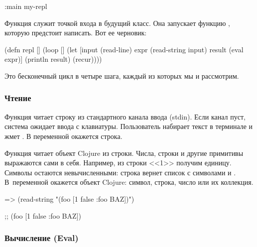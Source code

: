 \begin{english}
  \begin{clojure}
:main my-repl
  \end{clojure}
\end{english}

Функция  служит точкой входа в будущий класс. Она запускает функцию , которую предстоит написать. Вот ее черновик:

\begin{english}
  \begin{clojure}
(defn repl []
  (loop []
    (let [input (read-line)
          expr (read-string input)
          result (eval expr)]
      (println result)
      (recur))))
  \end{clojure}
\end{english}

Это бесконечный цикл в четыре шага, каждый из которых мы и рассмотрим.

\subsubsection{Чтение}


Функция  читает строку из стандартного канала ввода (stdin). Если канал пуст, система ожидает ввода с клавиатуры. Пользователь набирает текст в терминале и жмет \enter. В переменной  окажется строка.

Функция  читает объект Clojure из строки. Числа, строки и другие примитивы выражаются сами в себя. Например, из строки <<1>> получим единицу. Символы остаются невычисленными: строка  вернет список с символами  и . В~переменной  окажется объект Clojure: символ, строка, число или их коллекция.

\begin{english}
  \begin{clojure}
=> (read-string "(foo [1 false {:foo BAZ}])")

;; (foo [1 false {:foo BAZ}])
  \end{clojure}
\end{english}

\subsubsection{Вычисление (Eval)}


